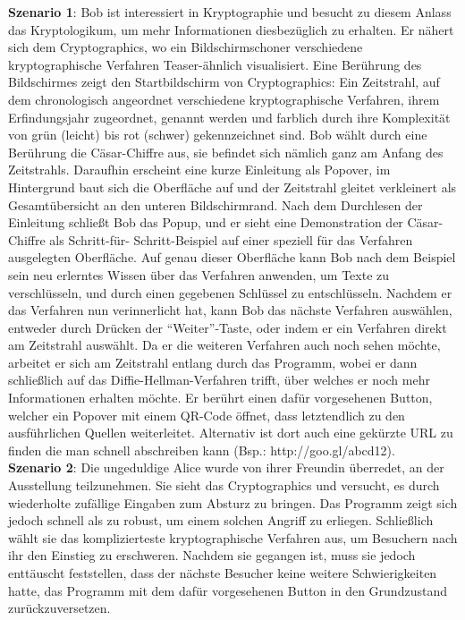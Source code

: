 \documentclass{article}
\begin{document}
\textbf{Szenario 1}:
Bob ist interessiert in Kryptographie und besucht zu diesem Anlass das \gls{Kryptologikum}, um mehr Informationen diesbezüglich zu erhalten. Er nähert sich dem \gls{Cryptographics}, wo ein Bildschirmschoner verschiedene kryptographische Verfahren Teaser-ähnlich visualisiert. Eine Berührung des Bildschirmes zeigt den Startbildschirm von \gls{Cryptographics}: Ein Zeitstrahl, auf dem chronologisch angeordnet verschiedene kryptographische Verfahren, ihrem Erfindungsjahr zugeordnet, genannt werden und farblich durch ihre Komplexität von grün (leicht) bis rot (schwer) gekennzeichnet sind. Bob wählt durch eine Berührung die Cäsar-Chiffre aus, sie befindet sich nämlich ganz am Anfang des Zeitstrahls. Daraufhin erscheint eine kurze Einleitung als Popover, im Hintergrund baut sich die Oberfläche auf und der Zeitstrahl gleitet verkleinert als Gesamtübersicht an den unteren Bildschirmrand. Nach dem Durchlesen der Einleitung schließt Bob das Popup, und er sieht eine Demonstration der Cäsar-Chiffre als Schritt-für-
Schritt-Beispiel auf 
einer speziell für das Verfahren ausgelegten Oberfläche. Auf genau dieser Oberfläche kann Bob nach dem Beispiel sein neu erlerntes Wissen über das Verfahren anwenden, um Texte zu verschlüsseln, und durch einen gegebenen Schlüssel zu entschlüsseln. Nachdem er das Verfahren nun verinnerlicht hat, kann Bob das nächste Verfahren auswählen, entweder durch Drücken der “Weiter”-Taste, oder indem er ein Verfahren direkt am Zeitstrahl auswählt. Da er die weiteren Verfahren auch noch sehen möchte, arbeitet er sich am Zeitstrahl entlang durch das Programm, wobei er dann schließlich auf das Diffie-Hellman-Verfahren trifft, über welches er noch mehr Informationen erhalten möchte. Er berührt einen dafür vorgesehenen Button, welcher ein Popover mit einem QR-Code öffnet, dass letztendlich zu den ausführlichen Quellen weiterleitet. Alternativ ist dort auch eine gekürzte URL zu finden die man schnell abschreiben kann (Bsp.: http://goo.gl/abcd12).\\

\textbf{Szenario 2}:
Die ungeduldige Alice wurde von ihrer Freundin überredet, an der Ausstellung teilzunehmen. Sie sieht das \gls{Cryptographics} und versucht, es durch wiederholte zufällige Eingaben zum Absturz zu bringen. Das Programm zeigt sich jedoch schnell als zu robust, um einem solchen Angriff zu erliegen. Schließlich wählt sie das komplizierteste kryptographische Verfahren aus, um Besuchern nach ihr den Einstieg zu erschweren. Nachdem sie gegangen ist, muss sie jedoch enttäuscht feststellen, dass der nächste Besucher keine weitere Schwierigkeiten hatte, das Programm mit dem dafür vorgesehenen Button in den Grundzustand zurückzuversetzen.\\
\end{document}
